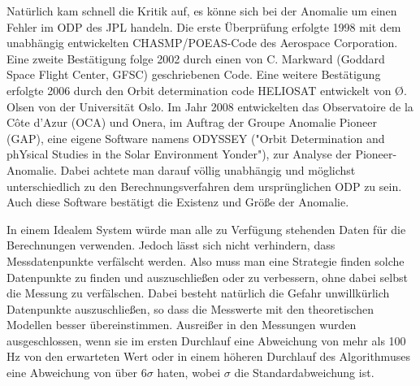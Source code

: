 Natürlich kam schnell die Kritik auf, es könne sich bei der Anomalie um einen Fehler im ODP des JPL handeln.
Die erste Überprüfung erfolgte 1998 mit dem unabhängig entwickelten CHASMP/POEAS-Code des Aerospace Corporation.
Eine zweite Bestätigung folge 2002 durch einen von C. Markward (Goddard Space Flight Center, GFSC) geschriebenen
Code.
Eine weitere Bestätigung erfolgte 2006 durch den Orbit determination code HELIOSAT entwickelt von Ø. Olsen von der
Universität Oslo.
Im Jahr 2008 entwickelten das Observatoire de la Côte d’Azur (OCA) und Onera, im Auftrag der Groupe Anomalie Pioneer (GAP),
eine eigene Software namens ODYSSEY ("Orbit Determination and phYsical Studies in the Solar Environment Yonder"), zur Analyse der Pioneer-Anomalie.
Dabei achtete man darauf völlig unabhängig und möglichst unterschiedlich zu den Berechnungsverfahren dem ursprünglichen ODP zu sein. 
Auch diese Software bestätigt die Existenz und Größe der Anomalie.\cite{Levy2008}


In einem Idealem System würde man alle zu Verfügung stehenden Daten für die Berechnungen verwenden. Jedoch lässt sich nicht verhindern, dass Messdatenpunkte verfälscht werden. Also muss man eine Strategie finden solche Datenpunkte zu finden und auszuschließen oder zu verbessern, ohne dabei selbst die Messung zu verfälschen. Dabei besteht natürlich die Gefahr unwillkürlich Datenpunkte auszuschließen, so dass die Messwerte mit den theoretischen Modellen besser übereinstimmen.
Ausreißer in den Messungen wurden ausgeschlossen, wenn sie im ersten Durchlauf eine Abweichung von mehr als 100 Hz von den erwarteten Wert oder in einem höheren Durchlauf des Algorithmuses eine Abweichung von über $6\sigma$ haten, wobei $\sigma$ die Standardabweichung ist.\cite{Levy2008} %
